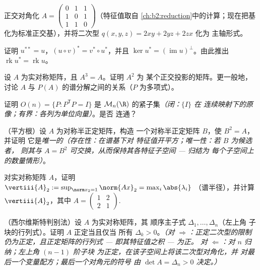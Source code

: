 \begin{exercise}[$\star$]\label{exo:b2:quadratic:2}
正交对角化 $A = \begin{pmatrix} 0 & 1 & 1\\ 1 & 0 &
1\\ 1 & 1 & 0\end{pmatrix}$（特征值取自
\cref{ch:b2:reduction}中的计算；现在把基
化为标准正交基），并将二次型 $q(x,y,z) = 2xy + 2yz + 2zx$ 化为
主轴形式。
\end{exercise}

\begin{exercise}[$\star$]\label{exo:b2:quadratic:3}
证明 $u^{**} = u$，$(u \circ v)^* = v^* \circ u^*$，并且
$\ker u^* = (\operatorname{im} u)^{\perp}$。由此推出
$\operatorname{rk} u^* = \operatorname{rk} u$。
\end{exercise}

\begin{exercise}[$\star\star$]\label{exo:b2:quadratic:4}
设 $A$ 为实对称矩阵，且 $A^3 = A$。证明 $A^2$ 为
某个正交投影的矩阵。更一般地，讨论
$A$ 与 $P(A)$ 的谱分解之间的关系（$P$ 为多项式）。
\end{exercise}

\begin{exercise}[$\star\star$]\label{exo:b2:quadratic:5}
证明 $O(n) = \{P : P^{\mathsf T}P = I\}$ 是
$\mathcal{M}_n(\R)$ 的紧子集\emph{（闭：$\{I\}$ 在
连续映射下的原像；有界：各列为单位向量）}。是否
连通？
\end{exercise}

\begin{exercise}[$\star\star$]\label{exo:b2:quadratic:6}
（平方根）设 $A$ 为对称半正定矩阵，构造
一个对称半正定矩阵 $B$，使 $B^2 = A$，并证明
它是\emph{唯一的}\emph{（存在性：在谱基下对
特征值开平方；唯一性：若 $B$ 为候选者，
则其与 $A = B^2$ 可交换，从而保持其各特征子空间 --- 归结为
每个子空间上的数量情形）}。
\end{exercise}

\begin{exercise}[$\star\star$]\label{exo:b2:quadratic:7}
对实对称矩阵 $A$，证明 $\vertiii{A}_2 :=
\sup_{\norm x_2 = 1}\norm{Ax}_2 = \max_i \abs{\lambda_i}$
（谱半径），并计算 $\vertiii{A}_2$，其中 $A =
\begin{pmatrix} 1 & 2\\ 2 & 1\end{pmatrix}$.
\end{exercise}

\begin{exercise}[$\star\star\star$]\label{exo:b2:quadratic:8}
（西尔维斯特判别法）设 $A$ 为实对称矩阵，其
顺序主子式 $\Delta_1, \dots, \Delta_n$（左上角
子块的行列式）。证明 $A$ 正定当且仅当
所有 $\Delta_k > 0$。\emph{（对 $\Rightarrow$：正定二次型的限制
仍为正定，且正定矩阵的行列式 ---
即其特征值之积 --- 为正。
对 $\Leftarrow$：对 $n$ 归纳；左上角 $(n-1)$ 阶子块
为正定，在该子空间上将该二次型对角化，并
对最后一个变量配方；最后一个对角元的符号
由 $\det A = \Delta_n > 0$ 决定。）}
\end{exercise}

